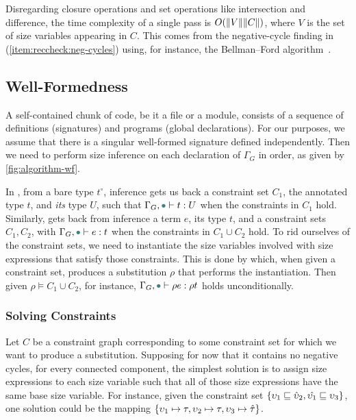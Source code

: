 Disregarding closure operations and set operations like intersection and difference, the time complexity of a single pass is $O(\lVert V\rVert\lVert C\rVert)$, where $V$ is the set of size variables appearing in $C$.
This comes from the negative-cycle finding in (\ref{item:reccheck:neg-cycles}) using, for instance, the Bellman--Ford algorithm~\citep{BellmanFord}.



\subsection{Well-Formedness}\label{sec:algorithm:wf}

A self-contained chunk of code, be it a file or a module, consists of a sequence of \coinductive definitions (signatures) and programs (global declarations).
For our purposes, we assume that there is a singular well-formed signature defined independently.
Then we need to perform size inference on each declaration of $\Gamma_G$ in order,
as given by \autoref{fig:algorithm-wf}.

In , from a bare type $t^\circ$, inference gets us back
a constraint set $C_1$, the annotated type $t$, and \emph{its} type $U$,
such that $\Gamma_G, \mt \vdash t : U$ when the constraints in $C_1$ hold.
Similarly,  gets back from inference a term $e$,
its type $t$, and a constraint sets $C_1, C_2$,
with $\Gamma_G, \mt \vdash e : t$ when the constraints in $C_1 \cup C_2$ hold.
To rid ourselves of the constraint sets, we need to instantiate the size variables involved with size expressions that satisfy those constraints.
This is done by \solve which, when given a constraint set, produces a substitution $\rho$ that performs the instantiation.
Then given $\rho \vDash C_1 \cup C_2$, for instance, $\Gamma_G, \mt \vdash \rho e : \rho t$ holds unconditionally.

\subsubsection{Solving Constraints}

Let $C$ be a constraint graph corresponding to some constraint set for which we want to produce a substitution.
Supposing for now that it contains no negative cycles, for every connected component,
the simplest solution is to assign size expressions to each size variable such that
all of those size expressions have the same base size variable.
For instance, given the constraint set $\{\upsilon_1 \sqsubseteq \hat{\upsilon}_2, \hat{\upsilon_1} \sqsubseteq \upsilon_3\}$,
one solution could be the mapping $\{\upsilon_1 \mapsto \tau, \upsilon_2 \mapsto \tau, \upsilon_3 \mapsto \hat{\tau}\}$.

